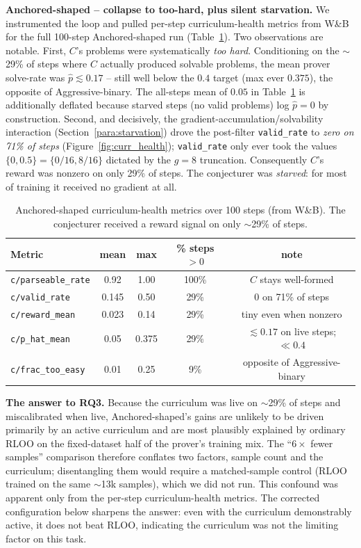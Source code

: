 \documentclass{article}
\begin{document}
\textbf{Anchored-shaped -- collapse to too-hard, plus silent starvation.} We instrumented
the loop and pulled per-step curriculum-health metrics from W\&B for the full
100-step Anchored-shaped run (Table~\ref{tab:health}). Two observations are notable. First, $C$'s
problems were systematically \emph{too hard}. Conditioning on the $\sim$29\% of
steps where $C$ actually produced solvable problems, the mean prover solve-rate
was $\hat{p}\lesssim0.17$ -- still well below the $0.4$ target (max ever $0.375$),
the opposite of Aggressive-binary. The all-steps mean of $0.05$ in Table~\ref{tab:health} is
additionally deflated because starved steps (no valid problems) log
$\hat{p}=0$ by construction. Second, and
decisively, the gradient-accumulation/solvability interaction
(Section~\ref{para:starvation}) drove the post-filter \texttt{valid\_rate} to
\emph{zero on 71\% of steps} (Figure~\ref{fig:curr_health}); \texttt{valid\_rate} only ever took the values
$\{0, 0.5\}=\{0/16, 8/16\}$ dictated by the $g{=}8$ truncation. Consequently
$C$'s reward was nonzero on only 29\% of steps. The conjecturer was
\emph{starved}: for most of training it received no gradient at all.

\begin{table}[h]
\centering\small
\caption{Anchored-shaped curriculum-health metrics over 100 steps (from W\&B). The
conjecturer received a reward signal on only $\sim$29\% of steps.}
\label{tab:health}
\begin{tabular}{lcccc}
\toprule
Metric & mean & max & \% steps $>0$ & note \\
\midrule
\texttt{c/parseable\_rate} & 0.92 & 1.00 & 100\% & $C$ stays well-formed \\
\texttt{c/valid\_rate}     & 0.145 & 0.50 & 29\% & 0 on 71\% of steps \\
\texttt{c/reward\_mean}    & 0.023 & 0.14 & 29\% & tiny even when nonzero \\
\texttt{c/p\_hat\_mean}    & 0.05 & 0.375 & 29\% & $\lesssim0.17$ on live steps; $\ll0.4$ \\
\texttt{c/frac\_too\_easy} & 0.01 & 0.25 & 9\% & opposite of Aggressive-binary \\
\bottomrule
\end{tabular}
\end{table}

\textbf{The answer to RQ3.} Because the curriculum was live on $\sim$29\% of
steps and miscalibrated when live, Anchored-shaped's gains are unlikely to be driven primarily
by an active curriculum and are most plausibly explained by ordinary RLOO on the
fixed-dataset half of the prover's training mix. The ``$6\times$ fewer samples'' comparison therefore conflates two factors, sample
count and the curriculum; disentangling them would require a matched-sample
control (RLOO trained on the same $\sim$13k samples), which we did not run. This
confound was apparent only from the per-step curriculum-health metrics. The
corrected configuration below sharpens the answer: even with the curriculum
demonstrably active, it does not beat RLOO, indicating the curriculum was not the
limiting factor on this task.
\end{document}
